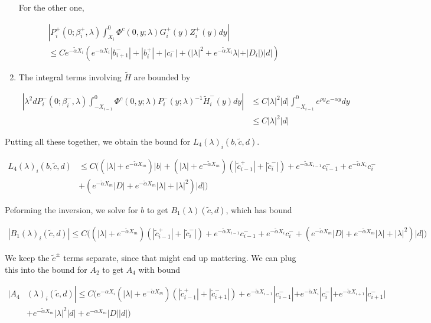 \documentclass[12pt]{article}
\begin{document}
\begin{enumerate}
For the other one,

\begin{align*}
&\left| P_i^+(0; \beta_i^+, \lambda) \int_{X_i}^0 \Phi^c(0, y; \lambda) G_i^+(y) Z_i^+(y) dy \right| \\
&\leq C e^{-\tilde{\alpha} X_i} \left( e^{-\alpha X_i} |b_{i+1}^-| + |b_i^+| + |c_i^-| + (|\lambda|^2 + e^{-\tilde{\alpha} X_i} \lambda| + |D_i|) |d| \right)
\end{align*}

\item The integral terms involving $\tilde{H}$ are bounded by

\begin{align*}
\left| \lambda^2 d P_i^-(0; \beta_i^-, \lambda) \int_{-X_{i-1}}^0 \Phi^c(0, y; \lambda) P_i^-(y; \lambda)^{-1} \tilde{H}_i^-(y) dy \right| &\leq C |\lambda|^2 |d| \int_{-X_{i-1}}^0 e^{\rho y} e^{-\alpha y} dy \\
&\leq C |\lambda|^2 |d|
\end{align*}

\end{enumerate}

Putting all these together, we obtain the bound for $L_4(\lambda)_i(b, \tilde{c}, d)$.

\begin{align*}
L_4(\lambda)_i(b, \tilde{c}, d) &\leq 
C\Big( (|\lambda| + e^{-\tilde{\alpha}X_m})|b| 
+ (|\lambda| + e^{-\tilde{\alpha}X_m})( |\tilde{c}_{i-1}^+| + |\tilde{c}_i^-|) + e^{-\tilde{\alpha} X_{i-1}} c_{i-1}^- + e^{-\tilde{\alpha} X_i} c_i^-\\
&+ ( e^{-\tilde{\alpha}X_m} |D| + e^{-\tilde{\alpha}X_m}|\lambda| + |\lambda|^2)|d| \Big)
\end{align*}

Peforming the inversion, we solve for $b$ to get $B_1(\lambda)(\tilde{c}, d)$, which has bound

\begin{align*}
|B_1(\lambda)_i(\tilde{c}, d)| \leq C\Big( 
(|\lambda| + e^{-\tilde{\alpha}X_m})( |\tilde{c}_{i-1}^+| + |\tilde{c}_i^-|)
+ e^{-\tilde{\alpha} X_{i-1}} c_{i-1}^- + e^{-\tilde{\alpha} X_i} c_i^- + ( e^{-\tilde{\alpha}X_m} |D| + e^{-\tilde{\alpha}X_m}|\lambda| + |\lambda|^2)|d| \Big)
\end{align*}

We keep the $\tilde{c}^\pm$ terms separate, since that might end up mattering. We can plug this into the bound for $A_2$ to get $A_4$ with bound

\begin{align*}
|A_4&(\lambda)_i(\tilde{c}, d)|
\leq C \Big( 
e^{-\alpha X_i} (|\lambda| + e^{-\tilde{\alpha}X_m})(|\tilde{c}_{i-1}^+| + |\tilde{c}_{i+1}^-|) + e^{-\tilde{\alpha}X_{i-1}}|c_{i-1}^-| + e^{-\tilde{\alpha}X_i}|c_i^-| + e^{-\tilde{\alpha}X_{i+1}}|c_{i+1}^-| \\
&+ e^{-\tilde{\alpha} X_m} |\lambda|^2|d| + e^{-\alpha X_m}|D||d| \Big)
\end{align*} 
\end{document}
